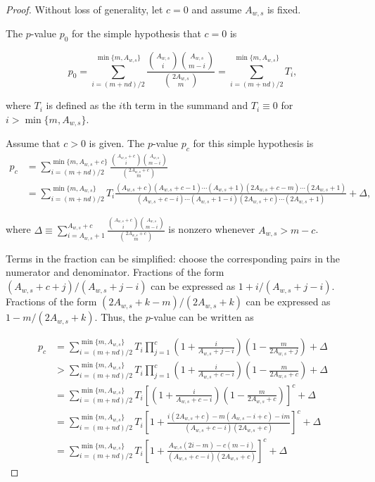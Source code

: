 \begin{proof}
Without loss of generality, let $c=0$ and assume $A_{w,s}$ is fixed.

The $p$-value $p_0$ for the simple hypothesis that $c=0$ is

\begin{equation}
  p_0 = \sum_{i = (m+nd)/2}^{\min\{m, A_{w,s}\}} \frac{ {A_{w,s} \choose i}{A_{w,s} \choose m-i} }{{2A_{w,s} \choose m}} =  \sum_{i = (m+nd)/2}^{\min\{m, A_{w,s}\}} T_i,
\end{equation}

where $T_i$ is defined as the $i$th term in the summand and $T_i \equiv 0$ for $i > \min\{m, A_{w,s}\}$.

Assume that $c>0$ is given.
The $p$-value $p_c$ for this simple hypothesis is
\begin{align*}
p_c &=   \sum_{i = (m+nd)/2}^{\min\{m, A_{w,s}+c\}} \frac{ {A_{w,s}+c \choose i}{A_{w,s} \choose m-i} }{{2A_{w,s}+c \choose m}}  \\
   &= \sum_{i = (m+nd)/2}^{\min\{m, A_{w,s}\}} T_i \frac{(A_{w,s} + c)(A_{w,s}+c-1)\cdots(A_{w,s}+1)(2A_{w,s}+c-m)\cdots(2A_{w,s}+1) }
   {(A_{w,s}+c-i)\cdots(A_{w,s}+1-i)(2A_{w,s}+c)\cdots(2A_{w,s}+1)} + \Delta,
\end{align*}

where $\Delta \equiv \sum_{i=A_{w,s}+1}^{A_{w,s}+c} \frac{ {A_{w,s}+c \choose i}{A_{w,s} \choose m-i} }{{2A_{w,s}+c \choose m}} $
 is nonzero whenever $A_{w,s} > m-c$.

Terms in the fraction can be simplified: choose the corresponding pairs in the numerator and denominator.
Fractions of the form $(A_{w,s}+c + j)/(A_{w,s}+j-i)$ can be expressed as $1 + i/(A_{w,s}+j-i)$.
Fractions of the form $(2A_{w,s}+k-m)/(2A_{w,s}+k)$ can be expressed as $1 - m/(2A_{w,s}+k)$.
Thus, the $p$-value can be written as 

\begin{align*}
p_c &= \sum_{i = (m+nd)/2}^{\min\{m, A_{w,s}\}} T_i \prod_{j=1}^c \left(1 + \frac{i}{A_{w,s} + j - i}\right)\left(1 - \frac{m}{2A_{w,s}+j}\right)  + \Delta\\
&> \sum_{i = (m+nd)/2}^{\min\{m, A_{w,s}\}} T_i \prod_{j=1}^c \left(1 + \frac{i}{A_{w,s} + c - i}\right)\left(1 - \frac{m}{2A_{w,s}+c}\right)  + \Delta\\
&= \sum_{i = (m+nd)/2}^{\min\{m, A_{w,s}\}} T_i \left[ \left(1 + \frac{i}{A_{w,s} + c - i}\right)\left(1 - \frac{m}{2A_{w,s}+c}\right) \right]^c + \Delta \\
&= \sum_{i = (m+nd)/2}^{\min\{m, A_{w,s}\}} T_i \left[ 1 + \frac{i(2A_{w,s}+c) - m(A_{w,s}-i+c) - im}{(A_{w,s} + c - i)(2A_{w,s}+c)} \right]^c  + \Delta\\
&= \sum_{i = (m+nd)/2}^{\min\{m, A_{w,s}\}} T_i \left[ 1 + \frac{A_{w,s}(2i-m) - c(m-i)}{(A_{w,s} + c - i)(2A_{w,s}+c)} \right]^c  + \Delta
\end{align*}


\end{proof}
